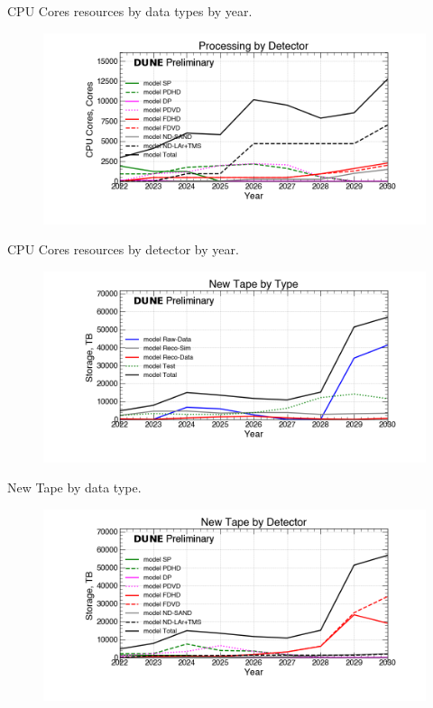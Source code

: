 \begin{table}[h]
\label{tab:CPU Cores_Types}
\caption{CPU Cores resources by data types by year.}
\end{table}
\pagebreak
\begin{figure}[ht]
\centering\includegraphics[height=0.4\textwidth]{Feb24_noMWC_Processing-by-Detector-CPU-Cores.png}\end{figure}
\begin{table}[h]
\label{tab:CPU Cores_Detectors}
\caption{CPU Cores resources by detector by year.}
\end{table}
\pagebreak
\begin{figure}[ht]
\centering\includegraphics[height=0.4\textwidth]{Feb24_noMWC_New-Tape-by-Type-Storage.png}\end{figure}
\begin{table}[h]
\label{tab:TapeByYearByType}
\caption{New Tape by data type.}
\end{table}
\pagebreak
\begin{figure}[ht]
\centering\includegraphics[height=0.4\textwidth]{Feb24_noMWC_New-Tape-by-Detector-Storage.png}\end{figure}

